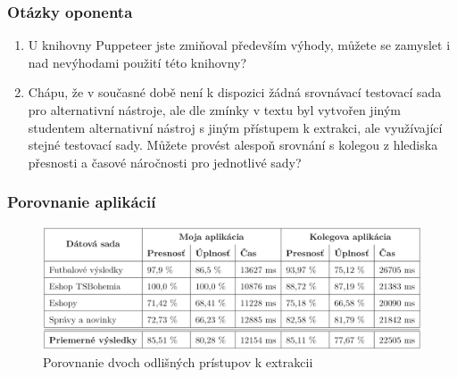 \documentclass[10pt,xcolor=pdflatex]{beamer}
\begin{document}
\begin{frame}\frametitle{Otázky oponenta}
    \begin{enumerate}
        \item U knihovny Puppeteer jste zmiňoval především výhody, můžete se zamyslet i nad nevýhodami použití této knihovny?
        \bigskip
        \item Chápu, že v současné době není k dispozici žádná srovnávací testovací sada pro alternativní nástroje, ale dle zmínky v textu byl vytvořen jiným studentem alternativní nástroj s jiným přístupem k extrakci, ale využívající stejné testovací sady. Můžete provést alespoň srovnání s kolegou z hlediska přesnosti a časové náročnosti pro jednotlivé sady?
    \end{enumerate}
\end{frame}

\begin{frame}\frametitle{Porovnanie aplikácií}
    \begin{figure}[hbt]
    	\centering
    	\includegraphics[width=1\textwidth]{img/vysledky.png}
    	\caption{Porovnanie dvoch odlišných prístupov k extrakcii}
    \end{figure}
\end{frame}

\end{document}
